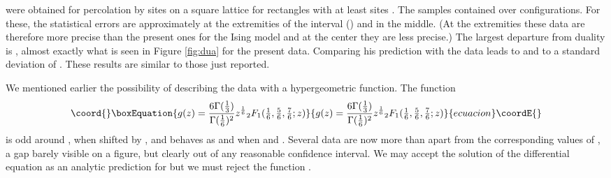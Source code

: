 \documentclass[a4paper,12pt]{article}
\begin{document}
were obtained for percolation by sites on a square lattice
for \coordHE{} rectangles with at least \coordHE{} sites \cite{LPS}. The 
samples contained over \coordHE{} configurations. For these, the statistical
errors are approximately \coordHE{} at the extremities of the
interval (\coordHE{}) and \coordHE{} in the middle. (At the
extremities these data are therefore more precise than the present ones for
the Ising model and at the center they are less precise.)
The largest departure
from duality is \coordHE{}, almost exactly what is seen in
Figure \ref{fig:dua} for the present data. Comparing his prediction
\coordHE{} with the data
leads to \coordHE{} and to a standard deviation of \coordHE{}.
These results are similar to those just reported.

We mentioned earlier the possibility of describing the data
with a hypergeometric function. The function 
\begin{equation*}\coord{}\boxEquation{
g(z)=\frac{6\Gamma(\frac13)}{\Gamma(\frac16)^2} z^{\frac16}{}_2F_1(
{\textstyle{\frac16}},{\textstyle{\frac56}},{\textstyle{\frac76}};z)
}{
g(z)=\frac{6\Gamma(\frac13)}{\Gamma(\frac16)^2} z^{\frac16}{}_2F_1(
{\textstyle{\frac16}},{\textstyle{\frac56}},{\textstyle{\frac76}};z)
}{ecuacion}\coordE{}\end{equation*}
is odd around \coordHE{}, when shifted by \coordHE{},
and behaves as \coordHE{} and \coordHE{}
when \coordHE{} and \coordHE{}. Several data are now
more than \coordHE{} apart from the corresponding values of \coordHE{}, 
a gap barely visible on a figure, but clearly out
of any reasonable confidence interval. We may accept the solution
of the differential equation as an analytic prediction for \coordHE{} but
we must reject the function \coordHE{}.
\end{document}
